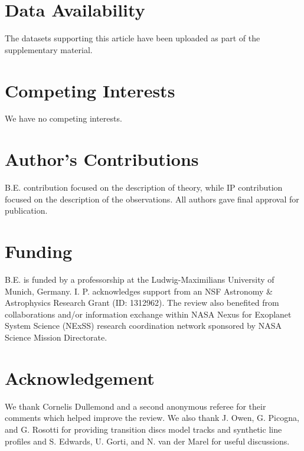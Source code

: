 \documentclass{rsos}
\begin{document}
\section*{Data Availability}
The datasets supporting this article have been uploaded as part of the supplementary material.

\section*{Competing Interests}
We have no competing interests.

\section*{Author's Contributions}
B.E. contribution focused on the description of theory, while IP contribution focused on the description of the observations. All authors gave final approval for publication. 

\section*{Funding}
B.E. is funded by a professorship at the Ludwig-Maximilians University of Munich, Germany. I. P. acknowledges support from an NSF Astronomy \& Astrophysics Research Grant (ID: 1312962). The review also benefited from collaborations and/or information exchange within NASA Nexus for Exoplanet System Science (NExSS) research coordination network sponsored by NASA Science Mission Directorate.

\section*{Acknowledgement}
We thank Cornelis Dullemond and a second anonymous referee for their comments which helped improve the review. We also thank J. Owen, G. Picogna, and G. Rosotti for providing transition discs model tracks and synthetic line profiles and S. Edwards, U. Gorti, and N. van der Marel for useful discussions. 



\end{document}
